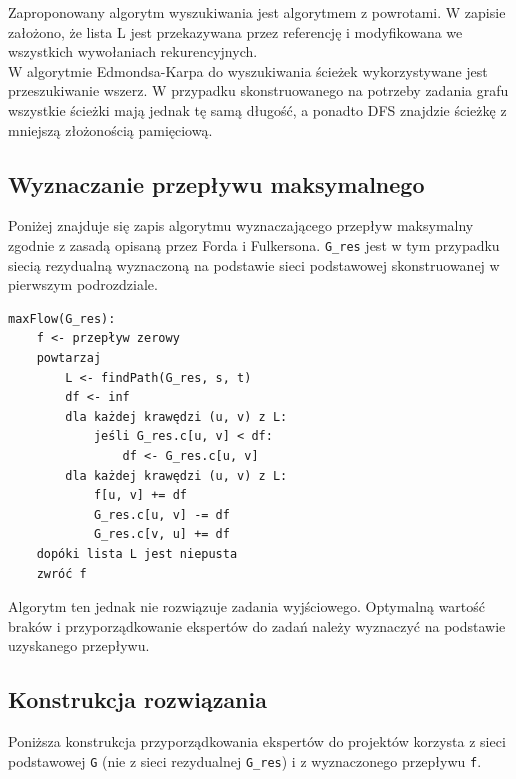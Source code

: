\documentclass[12pt,a4paper]{article}
\theoremstyle{definition}
\begin{document}
\vspace{0.5em}
\noindent
Zaproponowany algorytm wyszukiwania jest algorytmem z powrotami. W zapisie założono, że lista L jest przekazywana przez referencję i modyfikowana we wszystkich wywołaniach rekurencyjnych.\\

\noindent
W algorytmie Edmondsa-Karpa do wyszukiwania ścieżek wykorzystywane jest przeszukiwanie wszerz. W przypadku skonstruowanego na potrzeby zadania grafu wszystkie ścieżki mają jednak tę samą długość, a ponadto DFS znajdzie ścieżkę z mniejszą złożonością pamięciową.

\subsection{Wyznaczanie przepływu maksymalnego}
Poniżej znajduje się zapis algorytmu wyznaczającego przepływ maksymalny zgodnie z zasadą opisaną przez Forda i Fulkersona. \texttt{G\_res} jest w tym przypadku siecią rezydualną wyznaczoną na podstawie sieci podstawowej skonstruowanej w pierwszym podrozdziale.\\

\begin{tcolorbox}[title=Wyznaczanie przepływu maksymalnego]
\begin{verbatim}
maxFlow(G_res):
    f <- przepływ zerowy
    powtarzaj
        L <- findPath(G_res, s, t)
        df <- inf
        dla każdej krawędzi (u, v) z L:
            jeśli G_res.c[u, v] < df:
                df <- G_res.c[u, v]
        dla każdej krawędzi (u, v) z L:
            f[u, v] += df
            G_res.c[u, v] -= df
            G_res.c[v, u] += df
    dopóki lista L jest niepusta
    zwróć f
\end{verbatim}
\end{tcolorbox}

\vspace{0.5em}
\noindent
Algorytm ten jednak nie rozwiązuje zadania wyjściowego. Optymalną wartość braków i przyporządkowanie ekspertów do zadań należy wyznaczyć na podstawie uzyskanego przepływu.

\subsection{Konstrukcja rozwiązania}
Poniższa konstrukcja przyporządkowania ekspertów do projektów korzysta z sieci podstawowej \texttt{G} (nie z sieci rezydualnej \texttt{G\_res}) i z wyznaczonego przepływu \texttt{f}.\\
\end{document}
